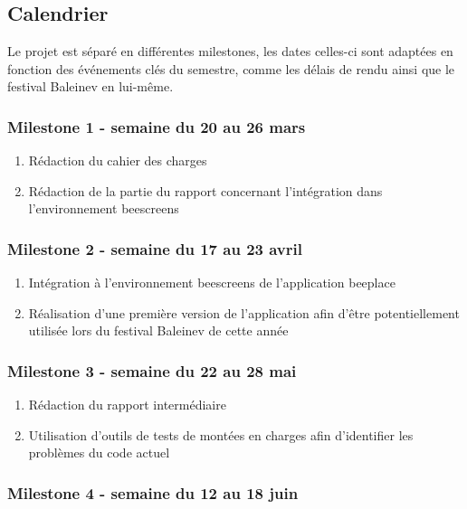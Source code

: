 \subsection{Calendrier}

Le projet est séparé en différentes milestones, les dates celles-ci sont adaptées en fonction des événements clés du semestre, comme les délais de rendu ainsi que le festival Baleinev en lui-même.

\subsubsection{Milestone 1 - semaine du 20 au 26 mars}

\begin{enumerate}
  \item Rédaction du cahier des charges
  \item Rédaction de la partie du rapport concernant l'intégration dans l'environnement \gls{beescreens}
\end{enumerate}

\subsubsection{Milestone 2 - semaine du 17 au 23 avril}

\begin{enumerate}
  \item Intégration à l'environnement \gls{beescreens} de l'application \gls{beeplace}
  \item Réalisation d'une première version de l'application afin d'être potentiellement utilisée lors du festival Baleinev de cette année
\end{enumerate}

\subsubsection{Milestone 3 - semaine du 22 au 28 mai}
\label{milestone3}

\begin{enumerate}
  \item Rédaction du rapport intermédiaire
  \item Utilisation d'outils de tests de montées en charges afin d'identifier les problèmes du code actuel
\end{enumerate}

\subsubsection{Milestone 4 - semaine du 12 au 18 juin}

